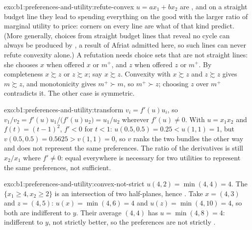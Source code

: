 \begin{solution}{exo:b1:preferences-and-utility:refute-convex}
 $u = ax_1 + bx_2$ are , and on a straight budget line
they lead to spending everything on the good with the larger ratio of
marginal utility to price: corners on every line are what  of that kind predict. (More generally, choices from straight
budget lines that reveal no cycle can always be produced by , a result of Afriat admitted here, so such lines can never
refute convexity alone.) A refutation needs choice sets that are not straight
lines: she chooses $x$ when offered $x$ or $m^{+}$, and $z$ when offered $z$ or
$m^{+}$. By completeness $x \succsim z$ or $z \succsim x$; say $x \succsim z$. Convexity
with $x \succsim z$ and $z \succsim z$ gives $m \succsim z$, and monotonicity gives
$m^{+} \succ m$, so $m^{+} \succ z$; choosing $z$ over $m^{+}$ contradicts it. The
other case is symmetric.
\end{solution}

\begin{solution}{exo:b1:preferences-and-utility:transform}
$v_i = f'(u)u_i$, so $v_1/v_2 = f'(u)u_1/\bigl(f'(u)u_2\bigr) = u_1/u_2$ wherever
$f'(u) \neq 0$. With $u = x_1x_2$ and $f(t) = (t - 1)^2$, $f' < 0$ for $t < 1$:
$u(0.5, 0.5) = 0.25 < u(1, 1) = 1$, but $v(0.5, 0.5) = 0.5625 > v(1, 1) = 0$, so
$v$ ranks the two bundles the other way and does not represent the same
preferences. The ratio of the derivatives is still $x_2/x_1$ where $f' \neq 0$:
equal  everywhere is necessary for two utilities to represent the same
preferences, not sufficient.
\end{solution}

\begin{solution}{exo:b1:preferences-and-utility:convex-not-strict}
$u(4, 2) = \min(4, 4) = 4$. The  $\{x_1 \ge 4, x_2 \ge 2\}$ is
an intersection of two half-planes, hence . Take $x = (4, 3)$ and
$z = (4, 5)$: $u(x) = \min(4, 6) = 4$ and $u(z) = \min(4, 10) = 4$, so both are
indifferent to $y$. Their average $(4, 4)$ has $u = \min(4, 8) = 4$: indifferent
to $y$, not strictly better, so the preferences are not strictly .
\end{solution}


